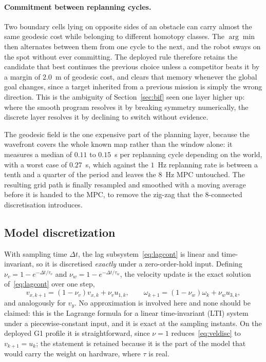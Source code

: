 \documentclass[11pt,a4paper]{article}
\begin{document}
\paragraph{Commitment between replanning cycles.} Two boundary cells lying on opposite sides of an obstacle
can carry almost the same geodesic cost while belonging to different homotopy classes. The $\arg\min$ then
alternates between them from one cycle to the next, and the robot sways on the spot without ever
committing. The deployed rule therefore retains the candidate that best continues the previous choice
unless a competitor beats it by a margin of $2.0$~m of geodesic cost, and clears that memory whenever the
global goal changes, since a target inherited from a previous mission is simply the wrong direction. This
is the ambiguity of Section~\ref{sec:bif} seen one layer higher up: where the smooth program resolves it by
breaking symmetry numerically, the discrete layer resolves it by declining to switch without evidence.

The geodesic field is the one expensive part of the planning layer, because the wavefront covers the whole
known map rather than the window alone: it measures a median of $0.11$ to $0.15$~s per replanning cycle
depending on the world, with a worst case of $0.27$~s, which against the $1$~Hz replanning rate is between
a tenth and a quarter of the period and leaves the $8$~Hz MPC untouched. The resulting grid path is finally
resampled and smoothed with a moving average before it is handed to the MPC, to remove the zig-zag that the
$8$-connected discretisation introduces.

\subsection{Model discretization}
\label{sec:discretization}

With sampling time $\Delta t$, the lag subsystem~\eqref{eq:lagcont} is linear and time-invariant, so it is
discretised \emph{exactly} under a zero-order-hold input. Defining
$\nu_v = 1-e^{-\Delta t/\tau_v}$ and $\nu_w = 1-e^{-\Delta t/\tau_w}$, the velocity update is the
exact solution of~\eqref{eq:lagcont} over one step,
\begin{equation}
  v_{x,k+1}=(1-\nu_v)v_{x,k}+\nu_v u_{1,k},\qquad
  \omega_{k+1}=(1-\nu_w)\omega_{k}+\nu_w u_{3,k},
  \label{eq:veldisc}
\end{equation}
and analogously for $v_y$. No approximation is involved here and none should be claimed: this is the Lagrange
formula for a linear time-invariant (LTI) system under a piecewise-constant input, and it is exact at the sampling instants. On the
deployed G1 profile it is straightforward, since $\nu=1$ reduces~\eqref{eq:veldisc} to
$v_{k+1}=u_k$; the statement is retained because it is the part of the model that would carry the weight on hardware, where $\tau$ is real.
\end{document}
